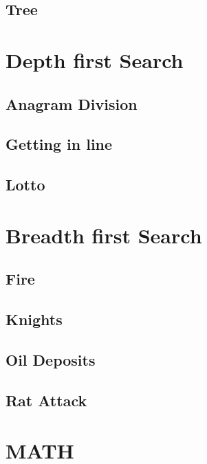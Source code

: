     \subsection{Tree}
        

\section{Depth first Search}
    \subsection{Anagram Division}
            
    \subsection{Getting in line}
            
    \subsection{Lotto}
            

\section{Breadth first Search}
    \subsection{Fire}
            
    \subsection{Knights}
            
    \subsection{Oil Deposits}
            
    \subsection{Rat Attack}
            

\section{MATH}
